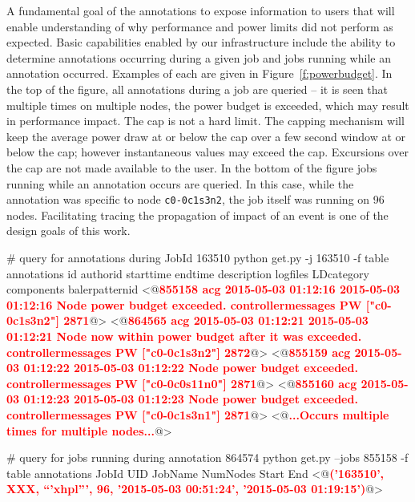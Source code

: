 A fundamental goal of the annotations to expose information to users that will enable
understanding of why performance and power limits did not perform as expected.
Basic capabilities enabled by our infrastructure include the ability to determine annotations occurring during a given job
and jobs running while an annotation occurred. Examples of each are given in Figure~\ref{f:powerbudget}.
In the top of the figure, all annotations during a job are queried -- it is seen that multiple times on multiple nodes, the
power budget is exceeded, which may result in performance impact. The cap is not a hard limit. The capping mechanism
will keep the average power draw at or below the cap over a few second window at or below the cap; however
instantaneous values may exceed the cap. Excursions over the cap are not made available to the user.
In the bottom of the figure jobs running while an annotation occurs are queried. In this case,
while the annotation was specific to node \texttt{c0-0c1s3n2}, the job itself was running on 96 nodes. Facilitating
tracing the propagation of impact of an event is one of the design goals of this work.

\begin{figure*}
\begin{annol}

# query for annotations during JobId 163510
python get.py -j 163510  -f table annotations
id	authorid	starttime	endtime		description	logfiles	LDcategory	components	balerpatternid
<@\textbf{\textcolor{red}{855158	acg	2015-05-03 01:12:16	2015-05-03 01:12:16	Node power budget exceeded.	controllermessages	PW	["c0-0c1s3n2"]	2871}}@>
<@\textbf{\textcolor{red}{864565	acg	2015-05-03 01:12:21	2015-05-03 01:12:21	Node now within power budget after it was exceeded.	controllermessages	PW	["c0-0c1s3n2"]	2872}}@>
<@\textbf{\textcolor{red}{855159	acg	2015-05-03 01:12:22	2015-05-03 01:12:22	Node power budget exceeded.	controllermessages	PW	["c0-0c0s11n0"]	2871}}@>
<@\textbf{\textcolor{red}{855160	acg	2015-05-03 01:12:23	2015-05-03 01:12:23	Node power budget exceeded.	controllermessages	PW	["c0-0c1s3n1"]	2871}}@>
<@\textbf{\textcolor{red}{...Occurs multiple times for multiple nodes...}}@>


# query for jobs running during annotation 864574
python get.py --jobs 855158 -f table annotations
JobId    UID    JobName    NumNodes    Start    End
<@\textbf{\textcolor{red}{('163510', XXX, ``'xhpl''', 96, '2015-05-03 00:51:24', '2015-05-03 01:19:15')}}@>

\end{annol}
\caption{Annotations provide access to power state information in otherwise unavailable logs. Basic implementation
capabilities include discovery of annotations during a job (top) and and jobs running while an annotation occurred (bottom).}
\label{f:powerbudget}
\end{figure*}


